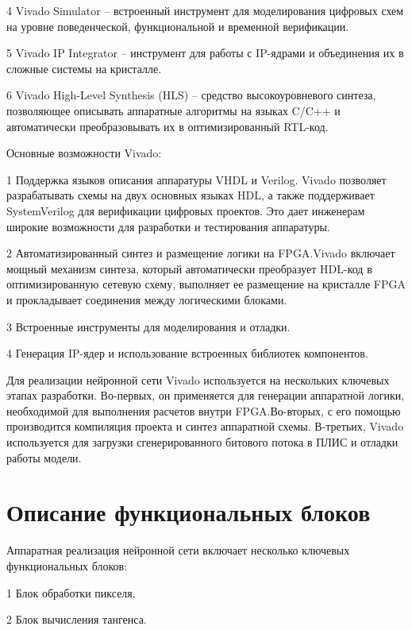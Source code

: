   4 {Vivado Simulator} – встроенный инструмент для   моделирования цифровых 
схем на уровне поведенческой, функциональной и временной верификации.

  5 {Vivado IP Integrator} – инструмент для работы с IP-ядрами и объединения их
в сложные системы на кристалле.

  6 {Vivado High-Level Synthesis (HLS)} – средство высокоуровневого синтеза, 
позволяющее описывать аппаратные алгоритмы на языках C/C++ и автоматически 
преобразовывать их в оптимизированный RTL-код.

Основные возможности Vivado:  

  1 Поддержка языков описания аппаратуры VHDL и Verilog. Vivado позволяет 
разрабатывать схемы на двух основных языках HDL, а также поддерживает 
SystemVerilog для верификации цифровых проектов. Это дает инженерам широкие 
возможности для разработки и тестирования аппаратуры.

   2 Автоматизированный синтез и размещение логики на FPGA.\@ Vivado включает 
мощный механизм синтеза, который автоматически преобразует HDL-код в 
оптимизированную сетевую схему, выполняет ее размещение на кристалле FPGA и 
прокладывает соединения между логическими блоками.

  3 Встроенные инструменты для моделирования и отладки. 

  4 Генерация IP-ядер и использование встроенных библиотек компонентов. 


Для реализации нейронной сети Vivado используется на нескольких ключевых этапах
разработки. Во-первых, он применяется для генерации аппаратной логики, 
необходимой для выполнения расчетов внутри FPGA.\@ Во-вторых, с его помощью 
производится компиляция проекта и синтез аппаратной схемы. В-третьих, Vivado 
используется для загрузки сгенерированного битового потока в ПЛИС и отладки 
работы модели.  

\section{Описание функциональных блоков}
\hspace*{12.5 mm}Аппаратная реализация нейронной сети включает несколько 
ключевых функциональных блоков:

  1 Блок обработки пикселя.

  2 Блок вычисления тангенса.

